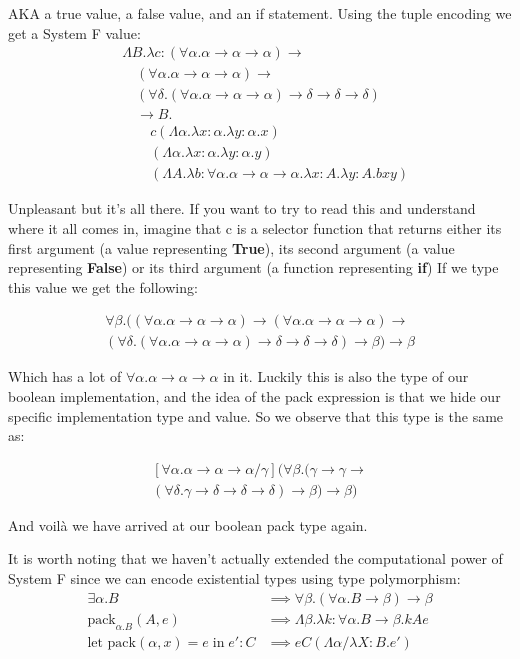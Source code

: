 \documentclass{article}
\newcommand{\inlineeq}[1]{
    \vspace{-2em}
    \begin{gather*}
    #1
    \end{gather*}
    \vspace{-2em}
}
\begin{document}
AKA a true value, a false value, and an if statement. Using the tuple encoding we get a System F value:
\begin{equation*}
\begin{split}
&\Lambda B.\lambda c: (\forall \alpha . \alpha  \to \alpha  \to \alpha )\to \\
&\quad(\forall \alpha . \alpha  \to \alpha  \to \alpha )\to \\
&\quad(\forall \delta. (\forall \alpha . \alpha  \to \alpha  \to \alpha ) \to \delta \to \delta \to \delta)\\
&\quad\to B. \\
&\qquad c (\Lambda \alpha . \lambda x : \alpha . \lambda y : \alpha . x) \\
&\qquad(\Lambda \alpha . \lambda x : \alpha . \lambda y : \alpha . y) \\
&\qquad(\Lambda A. \lambda b: \forall \alpha . \alpha  \to \alpha  \to \alpha . \lambda x: A. \lambda y: A. b x y)
\end{split}
\end{equation*}

Unpleasant but it's all there. If you want to try to read this and understand where it all comes in, imagine that c is a selector function that returns either its first argument (a value representing \textbf{True}), its second argument (a value representing \textbf{False}) or its third argument (a function representing \textbf{if}) If we type this value we get the following:

\inlineeq{
\forall \beta. ((\forall \alpha . \alpha  \to \alpha  \to \alpha )\to (\forall \alpha . \alpha  \to \alpha  \to \alpha )\to \\(\forall \delta . (\forall \alpha . \alpha  \to \alpha  \to \alpha )\to \delta \to \delta \to \delta) \to \beta) \to \beta
}

Which has a lot of $\forall \alpha . \alpha  \to \alpha  \to \alpha $ in it. Luckily this is also the type of our boolean implementation, and the idea of the pack expression is that we hide our specific implementation type and value. So we observe that this type is the same as:

\inlineeq{
[\forall \alpha . \alpha  \to \alpha  \to \alpha /\gamma ](\forall \beta. (\gamma \to \gamma \to \\(\forall \delta . \gamma \to \delta \to \delta \to \delta) \to \beta) \to \beta)
}

And voilà we have arrived at our boolean pack type again.

It is worth noting that we haven't actually extended the computational power of System F since we can encode existential types using type polymorphism:
\begin{equation*}
\begin{split}
\exists \alpha . B &\implies \forall \beta . (\forall \alpha. B \to \beta) \to \beta\\
\textrm{pack}_{\alpha.B}(A, e) &\implies \Lambda \beta . \lambda k : \forall \alpha . B \to \beta . k A e\\
\textrm{let pack}(\alpha, x) = e \; \textrm{in} \; e' : C &\implies e C (\Lambda \alpha / \lambda X : B . e')
\end{split}
\end{equation*}
\end{document}
